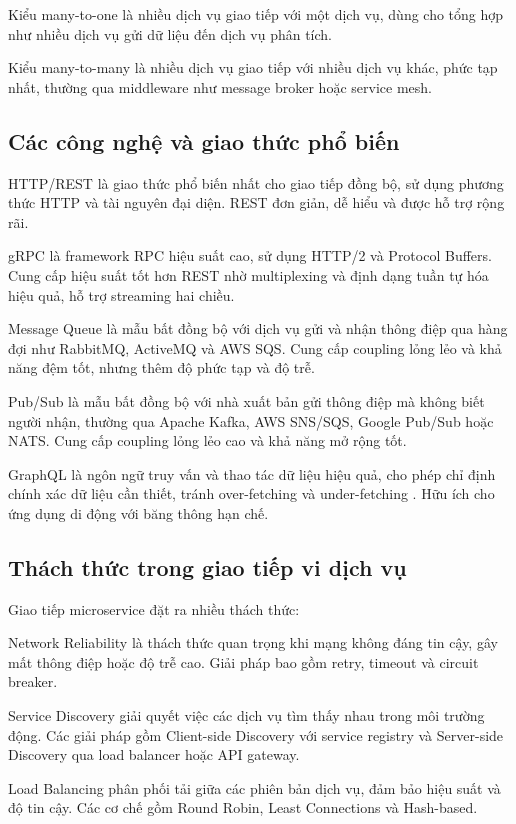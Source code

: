 Kiểu many-to-one là nhiều dịch vụ giao tiếp với một dịch vụ, dùng cho tổng hợp như nhiều dịch vụ gửi dữ liệu đến dịch vụ phân tích.

Kiểu many-to-many là nhiều dịch vụ giao tiếp với nhiều dịch vụ khác, phức tạp nhất, thường qua middleware như message broker hoặc service mesh.

\subsection{Các công nghệ và giao thức phổ biến}
HTTP/REST là giao thức phổ biến nhất cho giao tiếp đồng bộ, sử dụng phương thức HTTP và tài nguyên đại diện. REST đơn giản, dễ hiểu và được hỗ trợ rộng rãi.

gRPC là framework RPC hiệu suất cao, sử dụng HTTP/2 và Protocol Buffers. Cung cấp hiệu suất tốt hơn REST nhờ multiplexing và định dạng tuần tự hóa hiệu quả, hỗ trợ streaming hai chiều.

Message Queue là mẫu bất đồng bộ với dịch vụ gửi và nhận thông điệp qua hàng đợi như RabbitMQ, ActiveMQ và AWS SQS. Cung cấp coupling lỏng lẻo và khả năng đệm tốt, nhưng thêm độ phức tạp và độ trễ.

Pub/Sub là mẫu bất đồng bộ với nhà xuất bản gửi thông điệp mà không biết người nhận, thường qua Apache Kafka, AWS SNS/SQS, Google Pub/Sub hoặc NATS. Cung cấp coupling lỏng lẻo cao và khả năng mở rộng tốt.

GraphQL là ngôn ngữ truy vấn và thao tác dữ liệu hiệu quả, cho phép chỉ định chính xác dữ liệu cần thiết, tránh over-fetching và under-fetching \cite{richardson2019}. Hữu ích cho ứng dụng di động với băng thông hạn chế.
 
\subsection{Thách thức trong giao tiếp vi dịch vụ}
Giao tiếp microservice đặt ra nhiều thách thức:

Network Reliability là thách thức quan trọng khi mạng không đáng tin cậy, gây mất thông điệp hoặc độ trễ cao. Giải pháp bao gồm retry, timeout và circuit breaker.

Service Discovery giải quyết việc các dịch vụ tìm thấy nhau trong môi trường động. Các giải pháp gồm Client-side Discovery với service registry và Server-side Discovery qua load balancer hoặc API gateway.

Load Balancing phân phối tải giữa các phiên bản dịch vụ, đảm bảo hiệu suất và độ tin cậy. Các cơ chế gồm Round Robin, Least Connections và Hash-based.

